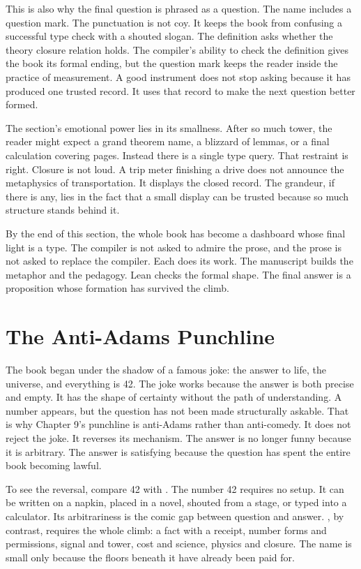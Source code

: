 This is also why the final question is phrased as a question. The name
 includes a question mark. The punctuation is not coy. It
keeps the book from confusing a successful type check with a shouted slogan.
The definition asks whether the theory closure relation holds. The compiler's
ability to check the definition gives the book its formal ending, but the
question mark keeps the reader inside the practice of measurement. A good
instrument does not stop asking because it has produced one trusted record. It
uses that record to make the next question better formed.

The section's emotional power lies in its smallness. After so much tower, the
reader might expect a grand theorem name, a blizzard of lemmas, or a final
calculation covering pages. Instead there is a single type query. That
restraint is right. Closure is not loud. A trip meter finishing a drive does
not announce the metaphysics of transportation. It displays the closed record.
The grandeur, if there is any, lies in the fact that a small display can be
trusted because so much structure stands behind it.

By the end of this section, the whole book has become a dashboard whose final
light is a type. The compiler is not asked to admire the prose, and the prose
is not asked to replace the compiler. Each does its work. The manuscript
builds the metaphor and the pedagogy. Lean checks the formal shape. The final
answer is a proposition whose formation has survived the climb.

\section{The Anti-Adams Punchline}
\label{se:anti-adams-punchline}

The book began under the shadow of a famous joke: the answer to life, the
universe, and everything is 42. The joke works because the answer is both
precise and empty. It has the shape of certainty without the path of
understanding. A number appears, but the question has not been made
structurally askable. That is why Chapter 9's punchline is anti-Adams rather
than anti-comedy. It does not reject the joke. It reverses its mechanism. The
answer is no longer funny because it is arbitrary. The answer is satisfying
because the question has spent the entire book becoming lawful.

To see the reversal, compare 42 with . The number 42
requires no setup. It can be written on a napkin, placed in a novel, shouted
from a stage, or typed into a calculator. Its arbitrariness is the comic gap
between question and answer. , by contrast, requires the
whole climb: a fact with a receipt, number forms and permissions, signal and
tower, cost and science, physics and closure. The name is small only because
the floors beneath it have already been paid for.

